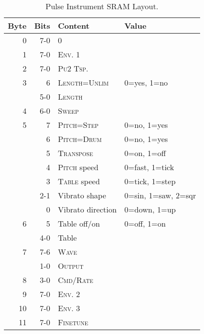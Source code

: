 \begin{table}
	\begin{center}
	\caption{Pulse Instrument SRAM Layout.}
	\label{tab:sram-pulse}
	\begin{tabular}{r|r|l|l}
		\toprule
    Byte & Bits & Content & Value \\
    \midrule
    0  & 7-0 & 0 & \\
    1  & 7-0 & \textsc{Env. 1} 		& \\
    2  & 7-0 & \textsc{Pu2 Tsp.} 	& \\
    3  & 6   & \textsc{Length=Unlim} 	& 0=yes, 1=no \\
       & 5-0 & \textsc{Length} 		& \\
    4  & 6-0 & \textsc{Sweep} 		& \\
    5  & 7   & \textsc{Pitch=Step} 	& 0=no, 1=yes \\
       & 6   & \textsc{Pitch=Drum} 	& 0=no, 1=yes \\
       & 5   & \textsc{Transpose} 	& 0=on, 1=off \\
       & 4   & \textsc{Pitch} speed	& 0=fast, 1=tick \\
       & 3   & \textsc{Table} speed	& 0=tick, 1=step \\
       & 2-1 & Vibrato shape		& 0=sin, 1=saw, 2=sqr \\
       & 0   & Vibrato direction	& 0=down, 1=up \\
    6  & 5   & Table off/on		& 0=off, 1=on \\
       & 4-0 & Table			& \\
    7  & 7-6 & \textsc{Wave}		& \\
       & 1-0 & \textsc{Output}		& \\
    8  & 3-0 & \textsc{Cmd/Rate}	& \\
    9  & 7-0 & \textsc{Env. 2}		& \\
    10 & 7-0 & \textsc{Env. 3}		& \\
    11 & 7-0 & \textsc{Finetune}	& \\
    \bottomrule
	\end{tabular}
	\end{center}
\end{table}

